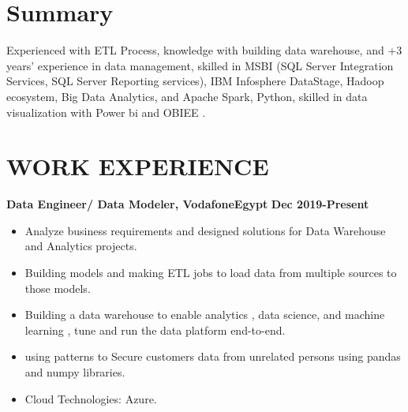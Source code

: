 \documentclass{res}
\begin{document}
\begin{resume}
	\vspace{-0.1in}

\section{Summary} 
\vspace{1.3 mm} 

   Experienced with ETL Process, knowledge with building data warehouse, and +3 years’ experience in data management, skilled in MSBI (SQL Server Integration Services, SQL Server Reporting services), IBM Infosphere DataStage, Hadoop ecosystem, Big Data Analytics, and Apache Spark, Python, skilled in data visualization with Power bi and OBIEE .       

\section{WORK EXPERIENCE}
\vspace{2 mm } 
\textbf{Data Engineer/ Data Modeler, VodafoneEgypt}
\quad \quad  \quad \quad \quad \quad \quad \quad \quad \quad \quad 
\quad \quad \quad\quad \quad \quad \quad \quad \quad\textbf{Dec 2019-Present} 
 \vspace{2 mm } 
\begin{itemize}
	\setlength\itemsep{0.001 em}
	\item Analyze business requirements and designed solutions for Data Warehouse and Analytics projects.
	\item Building models and making ETL jobs to load data from multiple sources to those models.
	\item  Building a data warehouse to enable analytics , data science, and machine learning , tune and run the data platform end-to-end.
	\item using patterns to Secure customers data from unrelated persons using pandas  and numpy libraries.	
	\item Cloud Technologies: Azure.
\end{itemize} 


\end{resume}
\end{document}
